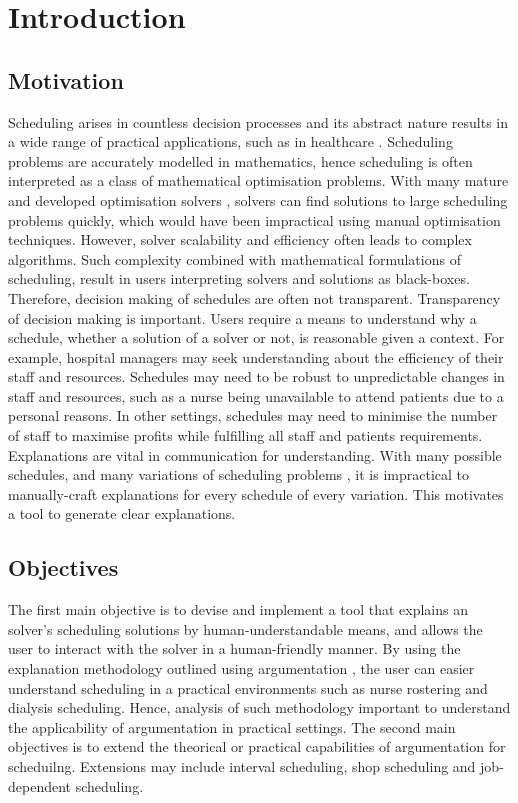\chapter{Introduction}
	
\section{Motivation}

Scheduling arises in countless decision processes and its abstract nature results in a wide range of practical applications, such as in healthcare \cite{sanr}. Scheduling problems are accurately modelled in mathematics, hence scheduling is often interpreted as a class of mathematical optimisation problems. With many mature and developed optimisation solvers \cite{clp}, solvers can find solutions to large scheduling problems quickly, which would have been impractical using manual optimisation techniques. However, solver scalability and efficiency often leads to complex algorithms. Such complexity combined with mathematical formulations of scheduling, result in users interpreting solvers and solutions as black-boxes. Therefore, decision making of schedules are often not transparent.
\linespace
Transparency of decision making is important. Users require a means to understand why a schedule, whether a solution of a solver or not, is reasonable given a context. For example, hospital managers may seek understanding about the efficiency of their staff and resources. Schedules may need to be robust to unpredictable changes in staff and resources, such as a nurse being unavailable to attend patients due to a personal reasons. In other settings, schedules may need to minimise the number of staff to maximise profits while fulfilling all staff and patients requirements.
\linespace
Explanations are vital in communication for understanding. With many possible schedules, and many variations of scheduling problems \cite{sta}, it is impractical to manually-craft explanations for every schedule of every variation. This motivates a tool to generate clear explanations.

\section{Objectives}

The first main objective is to devise and implement a tool that explains an solver's scheduling solutions by human-understandable means, and allows the user to interact with the solver in a human-friendly manner. By using the explanation methodology outlined using argumentation \cite{aes}, the user can easier understand scheduling in a practical environments such as nurse rostering and dialysis scheduling. Hence, analysis of such methodology important to understand the applicability of argumentation in practical settings.
\linespace
The second main objectives is to extend the theorical or practical capabilities of argumentation for scheduilng. Extensions may include interval scheduling, shop scheduling and job-dependent scheduling.

